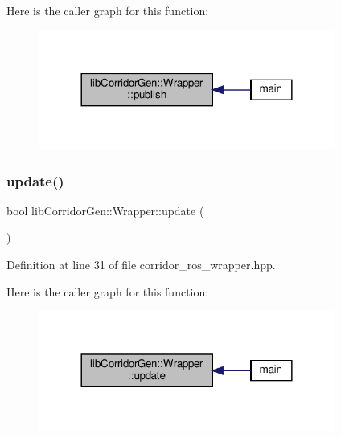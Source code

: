 Here is the caller graph for this function\+:
\nopagebreak
\begin{figure}[H]
\begin{center}
\leavevmode
\includegraphics[width=276pt]{classlib_corridor_gen_1_1_wrapper_af245b12ced576cd5623c399eb1ba84c1_icgraph}
\end{center}
\end{figure}
\mbox{\label{classlib_corridor_gen_1_1_wrapper_acd9549de373235c2252dd47e7ccae5e4}} 
\subsubsection{\texorpdfstring{update()}{update()}}
{\footnotesize\ttfamily bool lib\+Corridor\+Gen\+::\+Wrapper\+::update (\begin{DoxyParamCaption}{ }\end{DoxyParamCaption})\hspace{0.3cm}{\ttfamily [inline]}}



Definition at line 31 of file corridor\+\_\+ros\+\_\+wrapper.\+hpp.

Here is the caller graph for this function\+:
\nopagebreak
\begin{figure}[H]
\begin{center}
\leavevmode
\includegraphics[width=276pt]{classlib_corridor_gen_1_1_wrapper_acd9549de373235c2252dd47e7ccae5e4_icgraph}
\end{center}
\end{figure}


